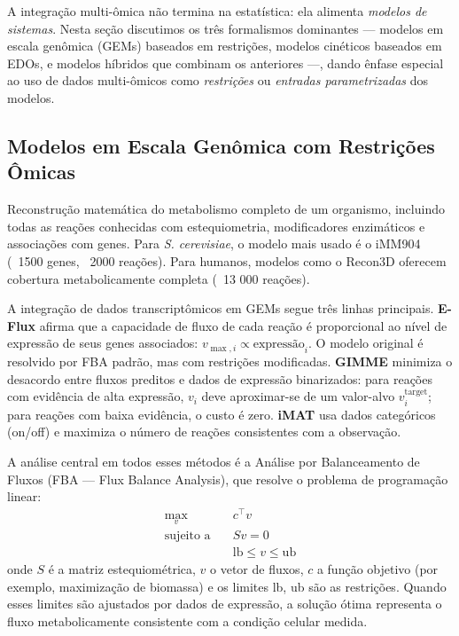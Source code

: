 A integração multi-ômica não termina na estatística: ela alimenta
\emph{modelos de sistemas}. Nesta seção discutimos os três formalismos
dominantes --- modelos em escala genômica (GEMs) baseados em restrições,
modelos cinéticos baseados em EDOs, e modelos híbridos que combinam os
anteriores ---, dando ênfase especial ao uso de dados multi-ômicos como
\emph{restrições} ou \emph{entradas parametrizadas} dos modelos.

\subsection{Modelos em Escala Genômica com Restrições Ômicas}
\label{sub:image11-gem}

\begin{definicaoenv}
Reconstrução matemática do metabolismo completo de um organismo, incluindo
todas as reações conhecidas com estequiometria, modificadores enzimáticos e
associações com genes. Para \textit{S. cerevisiae}, o modelo mais usado é
o iMM904 (~1500 genes, ~2000 reações). Para humanos, modelos como o Recon3D
oferecem cobertura metabolicamente completa (~13 000 reações).
\end{definicaoenv}

A integração de dados transcriptômicos em GEMs segue três linhas
principais. \textbf{E-Flux} afirma que a capacidade de fluxo de cada reação
é proporcional ao nível de expressão de seus genes associados: $v_{\max,i}
\propto \text{expressão}_i$. O modelo original é resolvido por FBA padrão,
mas com restrições modificadas. \textbf{GIMME} minimiza o desacordo entre
fluxos preditos e dados de expressão binarizados: para reações com
evidência de alta expressão, $v_i$ deve aproximar-se de um valor-alvo
$v_i^{\text{target}}$; para reações com baixa evidência, o custo é zero.
\textbf{iMAT} usa dados categóricos (on/off) e maximiza o número de
reações consistentes com a observação.

A análise central em todos esses métodos é a Análise por Balanceamento de
Fluxos (FBA --- Flux Balance Analysis), que resolve o problema de
programação linear:
\begin{align}
\max_v \quad & c^{\top} v \\
\text{sujeito a} \quad & S v = 0 \\
                       & \mathrm{lb} \leq v \leq \mathrm{ub}
\end{align}
onde $S$ é a matriz estequiométrica, $v$ o vetor de fluxos, $c$ a função
objetivo (por exemplo, maximização de biomassa) e os limites lb, ub são as
restrições. Quando esses limites são ajustados por dados de expressão, a
solução ótima representa o fluxo metabolicamente consistente com a
condição celular medida.

